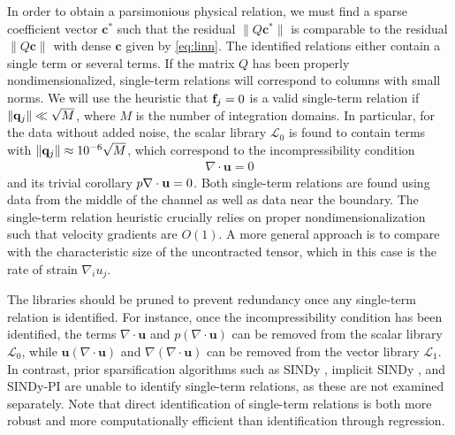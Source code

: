 \documentclass[preprint]{article}
\def\bi#1{\textbf{#1}}
\def\mx#1{#1}
\begin{document}
In order to obtain a parsimonious physical relation, we must find a sparse coefficient vector ${\bi c}^*$ such that the residual $\|\mx{Q}{\bi c}^*\|$ is comparable to the residual $\|\mx{Q}{\bi c}\|$ with dense ${\bi c}$ given by \eqref{eq:linn}. 
The identified relations either contain a single term or several terms. If the matrix $Q$ has been properly nondimensionalized, single-term relations will correspond to columns with small norms. We will use the heuristic that ${\bf f}_j = 0$ is a valid single-term relation if 
$\|{\bf q}_j\| \ll \sqrt{M}$, 
where $M$ is the number of integration domains. In particular, for the data without added noise, the scalar library $\mathcal{L}_0$ is found to contain terms with $\| {\bf q}_j \| \approx 10^{-6} \sqrt{M}$, which correspond to the incompressibility condition
\begin{align}\label{eq:divu}
    \nabla\cdot{\bi u}=0
\end{align}
and its trivial corollary $p \nabla \cdot {\bf u} = 0$. Both single-term relations are found using data from the middle of the channel as well as data near the boundary. The single-term relation heuristic crucially relies on proper nondimensionalization such that velocity gradients are $O(1)$. A more general approach is to compare with the characteristic size of the uncontracted tensor, which in this case is the rate of strain $\nabla_i u_j$.

The libraries should be pruned to prevent redundancy once any single-term relation is identified. For instance, once the incompressibility condition has been identified, the terms $\nabla \cdot {\bi u}$ and $p(\nabla \cdot {\bi u})$ can be removed from the scalar library $\mathcal{L}_0$, while ${\bi u}( \nabla \cdot {\bi u})$ and $\nabla( \nabla \cdot {\bi u})$ can be removed from the vector library $\mathcal{L}_1$. 
In contrast, prior sparsification algorithms such as SINDy \citep{brunton2016}, implicit SINDy \citep{mangan2016}, and SINDy-PI \citep{kaheman2020} are unable to identify single-term relations, as these are not examined separately.  Note that direct identification of single-term relations is both more robust and more computationally efficient than identification through regression.
\end{document}
